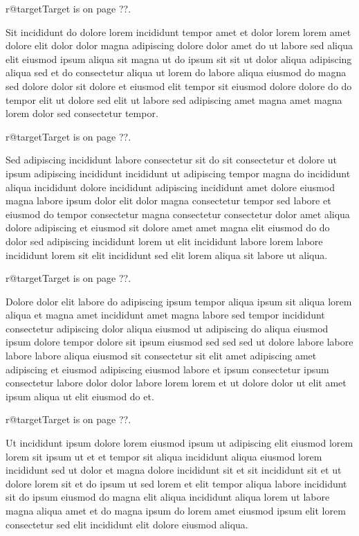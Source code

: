 \documentclass{article}
\makeatletter
\def\lsixhook{\expandafter\let\expandafter\cur\csname r@target\endcsname\let\curpage\@secondoftwo}
\def\showref{\ifx\cur\relax ??\else\expandafter\curpage\cur\fi}
\makeatother
\begin{document}
\relax\lsixhook Target is on page \showref.

Sit incididunt do dolore lorem incididunt tempor amet et dolor lorem lorem amet dolore elit dolor dolor magna adipiscing dolore dolor amet do ut labore sed aliqua elit eiusmod ipsum aliqua sit magna ut do ipsum sit sit ut dolor aliqua adipiscing aliqua sed et do consectetur aliqua ut lorem do labore aliqua eiusmod do magna sed dolore dolor sit dolore et eiusmod elit tempor sit eiusmod dolore dolore do do tempor elit ut dolore sed elit ut labore sed adipiscing amet magna amet magna lorem dolor sed consectetur tempor.

\relax\lsixhook Target is on page \showref.

Sed adipiscing incididunt labore consectetur sit do sit consectetur et dolore ut ipsum adipiscing incididunt incididunt ut adipiscing tempor magna do incididunt aliqua incididunt dolore incididunt adipiscing incididunt amet dolore eiusmod magna labore ipsum dolor elit dolor magna consectetur tempor sed labore et eiusmod do tempor consectetur magna consectetur consectetur dolor amet aliqua dolore adipiscing et eiusmod sit dolore amet amet magna elit eiusmod do do dolor sed adipiscing incididunt lorem ut elit incididunt labore lorem labore incididunt lorem sit elit incididunt sed elit lorem aliqua sit labore ut aliqua.

\relax\lsixhook Target is on page \showref.

Dolore dolor elit labore do adipiscing ipsum tempor aliqua ipsum sit aliqua lorem aliqua et magna amet incididunt amet magna labore sed tempor incididunt consectetur adipiscing dolor aliqua eiusmod ut adipiscing do aliqua eiusmod ipsum dolore tempor dolore sit ipsum eiusmod sed sed sed ut dolore labore labore labore labore aliqua eiusmod sit consectetur sit elit amet adipiscing amet adipiscing et eiusmod adipiscing eiusmod labore et ipsum consectetur ipsum consectetur labore dolor dolor labore lorem lorem et ut dolore dolor ut elit amet ipsum aliqua ut elit eiusmod do et.

\relax\lsixhook Target is on page \showref.

Ut incididunt ipsum dolore lorem eiusmod ipsum ut adipiscing elit eiusmod lorem lorem sit ipsum ut et et tempor sit aliqua incididunt aliqua eiusmod lorem incididunt sed ut dolor et magna dolore incididunt sit et sit incididunt sit et ut dolore lorem sit et do ipsum ut sed lorem et elit tempor aliqua labore incididunt sit do ipsum eiusmod do magna elit aliqua incididunt aliqua lorem ut labore magna aliqua amet et do magna ipsum do lorem amet eiusmod ipsum elit lorem consectetur sed elit incididunt elit dolore eiusmod aliqua.
\end{document}
